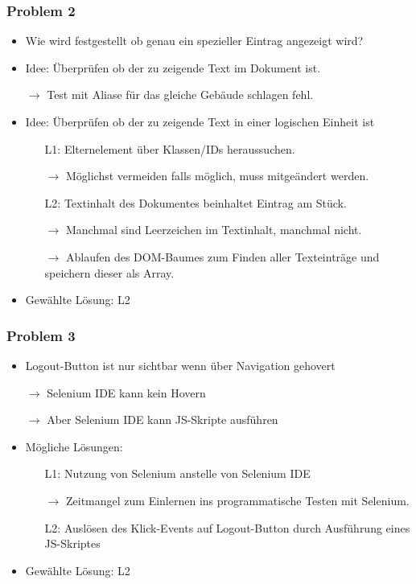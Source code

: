 \begin{frame}\frametitle{Problem 2}
    \begin{itemize}
        \item Wie wird festgestellt ob genau ein spezieller Eintrag angezeigt wird?
        \item Idee: Überprüfen ob der zu zeigende Text im Dokument ist.
        \item[$\rightarrow$] Test mit Aliase für das gleiche Gebäude schlagen fehl.
        \item Idee: Überprüfen ob der zu zeigende Text in einer logischen Einheit ist \begin{itemize}
            \item[L1:] Elternelement über Klassen/IDs heraussuchen.
            \item[$\rightarrow$] Möglichst vermeiden falls möglich, muss mitgeändert werden.
            \item[L2:]Textinhalt des Dokumentes beinhaltet Eintrag am Stück.
            \item[$\rightarrow$] Manchmal sind Leerzeichen im Textinhalt, manchmal nicht.
            \item[$\rightarrow$] Ablaufen des DOM-Baumes zum Finden aller Texteinträge und speichern dieser als Array.
        \end{itemize} 
        \pause
        \item Gewählte Lösung: L2
    \end{itemize}
\end{frame}

\begin{frame}\frametitle{Problem 3}
    \begin{itemize}
        \item Logout-Button ist nur sichtbar wenn über Navigation gehovert
        \item[$\rightarrow$] Selenium IDE kann kein Hovern
        \item[$\rightarrow$] Aber Selenium IDE kann JS-Skripte ausführen
        \item Mögliche Lösungen: \begin{itemize}
            \item[L1:] Nutzung von Selenium anstelle von Selenium IDE
            \item[$\rightarrow$] Zeitmangel zum Einlernen ins programmatische Testen mit Selenium.
            \item[L2:] Auslösen des Klick-Events auf Logout-Button durch Ausführung eines JS-Skriptes 
        \end{itemize}
        \pause
        \item Gewählte Lösung: L2
    \end{itemize}
\end{frame}

